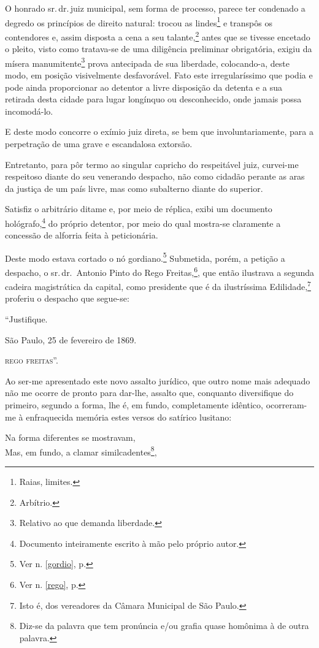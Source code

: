O honrado sr.\,dr.\,juiz municipal, sem forma de processo, parece ter
condenado a degredo os princípios de direito natural: trocou as
lindes\footnote{Raias, limites.} e transpôs os contendores e, assim
disposta a cena a seu talante,\footnote{Arbítrio.} antes que se
tivesse encetado o pleito, visto como tratava-se de uma diligência
preliminar obrigatória, exigiu da mísera manumitente\footnote{Relativo
  ao que demanda liberdade.} prova antecipada de sua liberdade,
colocando-a, deste modo, em posição visivelmente desfavorável. Fato este
irregularíssimo que podia e pode ainda proporcionar ao detentor a livre
disposição da detenta e a sua retirada desta cidade para lugar longínquo
ou desconhecido, onde jamais possa incomodá-lo.

E deste modo concorre o exímio juiz direta, se bem que
involuntariamente, para a perpetração de uma grave e escandalosa
extorsão.

Entretanto, para pôr termo ao singular capricho do respeitável juiz,
curvei-me respeitoso diante do seu venerando despacho, não como cidadão
perante as aras da justiça de um país livre, mas como subalterno diante
do superior.

Satisfiz o arbitrário ditame e, por meio de réplica, exibi um documento
hológrafo,\footnote{Documento inteiramente escrito à mão pelo próprio
  autor.} do próprio detentor, por meio do qual mostra-se claramente a
concessão de alforria feita à peticionária.

Deste modo estava cortado o nó gordiano.\footnote{Ver n. \ref{gordio}, p. 
\pageref{gordio}} Submetida, porém, a petição a despacho, o sr.\,dr.~Antonio 
Pinto do Rego Freitas,\footnote{Ver n. \ref{rego}, p. \pageref{rego}}, 
que então ilustrava a segunda cadeira magistrática da capital, como presidente 
que é da ilustríssima Edilidade,\footnote{Isto é, dos vereadores da 
Câmara Municipal de São Paulo.} proferiu o despacho que segue-se:

``Justifique.
\begin{flushright}
São Paulo, 25 de fevereiro de 1869.

\textsc{rego freitas}''.
\end{flushright}
Ao ser-me apresentado este novo assalto jurídico, que outro nome mais
adequado não me ocorre de pronto para dar-lhe, assalto que, conquanto
diversifique do primeiro, segundo a forma, lhe é, em fundo,
completamente idêntico, ocorreram-me à enfraquecida memória estes versos
do satírico lusitano:

Na forma diferentes se mostravam,\\
Mas, em fundo, a clamar similcadentes\footnote{Diz-se da palavra que
  tem pronúncia e/ou grafia quase homônima à de outra palavra.},

